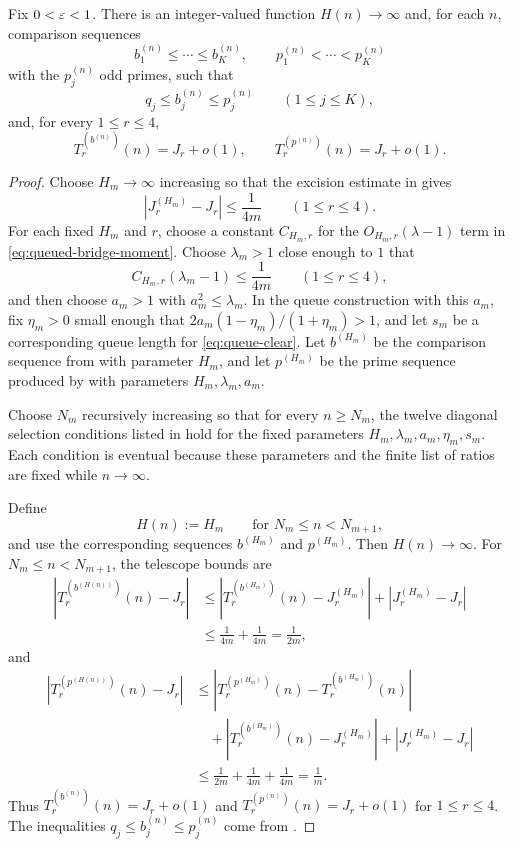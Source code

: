 \begin{proposition}
\label{prop:prime-bridge-diagonalization}
Fix $0<\varepsilon<1$.  There is an integer-valued function $H(n)\to\infty$ and,
for each $n$, comparison sequences
\[
  b_1^{(n)}\le\cdots\le b_K^{(n)},\qquad p_1^{(n)}<\cdots<p_K^{(n)}
\]
with the $p_j^{(n)}$ odd primes, such that
\[
  q_j\le b_j^{(n)}\le p_j^{(n)}\qquad (1\le j\le K),
\]
and, for every $1\le r\le4$,
\[
  T_r^{(b^{(n)})}(n)=J_r+o(1),
  \qquad
  T_r^{(p^{(n)})}(n)=J_r+o(1).
\]
\end{proposition}

\begin{proof}
Choose $H_m\to\infty$ increasing so that the excision estimate in
 gives
\[
  |J_r^{(H_m)}-J_r|\le \frac{1}{4m}
  \qquad (1\le r\le4).
  \tag{7.8}\label{eq:diag-excision}
\]
For each fixed $H_m$ and $r$, choose a constant $C_{H_m,r}$ for the
$O_{H_m,r}(\lambda-1)$ term in \eqref{eq:queued-bridge-moment}.  Choose
$\lambda_m>1$ close enough to $1$ that
\[
  C_{H_m,r}(\lambda_m-1)\le \frac{1}{4m}
  \qquad (1\le r\le4),
  \tag{7.9}\label{eq:diag-lambda}
\]
and then choose $a_m>1$ with $a_m^2\le\lambda_m$.  In the queue construction
with this $a_m$, fix $\eta_m>0$ small enough that
$2a_m(1-\eta_m)/(1+\eta_m)>1$, and let $s_m$ be a corresponding queue length
for \eqref{eq:queue-clear}.  Let $b^{(H_m)}$ be the comparison sequence from
 with parameter $H_m$, and let $p^{(H_m)}$ be
the prime sequence produced by  with
parameters $H_m,\lambda_m,a_m$.

Choose $N_m$ recursively increasing so that for every $n\ge N_m$, the twelve
diagonal selection conditions listed in
 hold for the fixed parameters
$H_m,\lambda_m,a_m,\eta_m,s_m$.  Each condition is eventual because these
parameters and the finite list of ratios are fixed while $n\to\infty$.

Define
\[
  H(n):=H_m\qquad\text{for }N_m\le n<N_{m+1},
\]
and use the corresponding sequences $b^{(H_m)}$ and $p^{(H_m)}$.  Then
$H(n)\to\infty$.  For $N_m\le n<N_{m+1}$, the telescope bounds are
\[
\begin{aligned}
  |T_r^{(b^{(H(n))})}(n)-J_r|
  &\le
  |T_r^{(b^{(H_m)})}(n)-J_r^{(H_m)}|
  +|J_r^{(H_m)}-J_r|  \\
  &\le \frac{1}{4m}+\frac{1}{4m}
  =\frac{1}{2m},
\end{aligned}
\]
and
\[
\begin{aligned}
  |T_r^{(p^{(H(n))})}(n)-J_r|
  &\le
  |T_r^{(p^{(H_m)})}(n)-T_r^{(b^{(H_m)})}(n)| \\
  &\quad
  +|T_r^{(b^{(H_m)})}(n)-J_r^{(H_m)}|
  +|J_r^{(H_m)}-J_r|  \\
  &\le \frac{1}{2m}+\frac{1}{4m}+\frac{1}{4m}
  =\frac1m .
\end{aligned}
\]
Thus $T_r^{(b^{(n)})}(n)=J_r+o(1)$ and
$T_r^{(p^{(n)})}(n)=J_r+o(1)$ for $1\le r\le4$.  The inequalities
$q_j\le b_j^{(n)}\le p_j^{(n)}$ come from
.
\end{proof}

